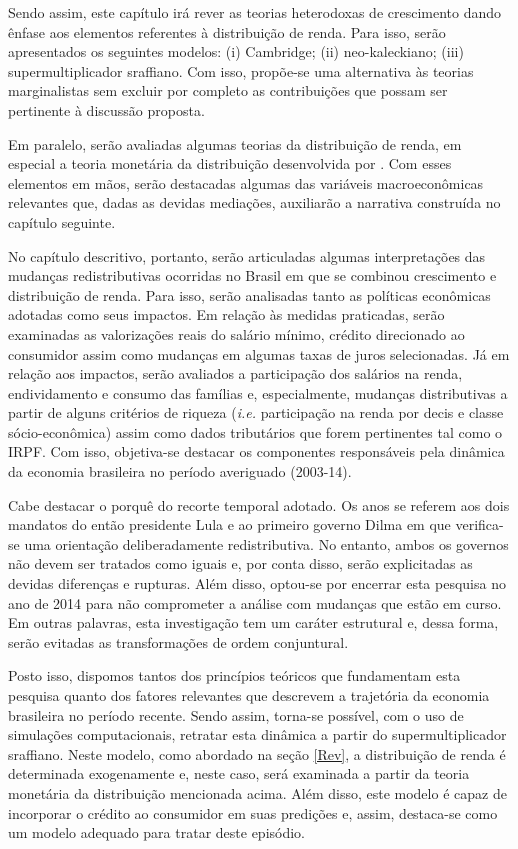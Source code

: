 Sendo assim, este capítulo irá rever as teorias heterodoxas de crescimento dando ênfase aos elementos referentes à distribuição de renda. Para isso, serão apresentados os seguintes modelos: (i) Cambridge; (ii) neo-kaleckiano; (iii) supermultiplicador sraffiano. Com isso, propõe-se uma alternativa às teorias marginalistas sem excluir por completo as contribuições que possam ser pertinente à discussão proposta.

Em paralelo, serão avaliadas algumas teorias da distribuição de renda, em especial a teoria monetária da distribuição desenvolvida por \textcite{pivetti_essay_1992}. Com esses elementos em mãos, serão destacadas algumas das variáveis macroeconômicas relevantes que, dadas as devidas mediações, auxiliarão a narrativa construída no capítulo seguinte.

No capítulo descritivo, portanto, serão articuladas algumas interpretações das mudanças redistributivas ocorridas no Brasil em que se combinou crescimento e distribuição de renda. Para isso, serão analisadas tanto as políticas econômicas adotadas como seus impactos. Em relação às medidas praticadas, serão examinadas as valorizações reais do salário mínimo, crédito direcionado ao consumidor assim como mudanças em algumas taxas de juros selecionadas. Já em relação aos impactos, serão avaliados a participação dos salários na renda, endividamento e consumo das famílias e, especialmente, mudanças distributivas a partir de alguns critérios de riqueza (\textit{i.e.} participação na renda por decis e classe sócio-econômica) assim como dados tributários que forem pertinentes tal como o IRPF. Com isso, objetiva-se destacar os componentes responsáveis pela dinâmica da economia brasileira no período averiguado (2003-14). 

Cabe destacar o porquê do recorte temporal adotado. Os anos se referem aos dois mandatos do então presidente Lula e ao primeiro governo Dilma em que verifica-se uma orientação deliberadamente redistributiva. No entanto, ambos os governos não devem ser tratados como iguais e, por conta disso, serão explicitadas as devidas diferenças e rupturas. Além disso, optou-se por encerrar esta pesquisa no ano de 2014 para não comprometer a análise com mudanças que estão em curso. Em outras palavras, esta investigação tem um caráter estrutural e, dessa forma, serão evitadas as transformações de ordem conjuntural. 

Posto isso, dispomos tantos dos princípios teóricos que fundamentam esta pesquisa quanto dos fatores relevantes que descrevem a trajetória da economia brasileira no período recente. Sendo assim, torna-se possível, com o uso de simulações computacionais, retratar esta dinâmica a partir do supermultiplicador sraffiano. Neste modelo, como abordado na seção \ref{Rev},  a distribuição de renda é determinada exogenamente e, neste caso, será examinada a partir da teoria monetária da distribuição mencionada acima. Além disso, este modelo é capaz de incorporar o crédito ao consumidor em suas predições e, assim, destaca-se como um modelo adequado para tratar deste episódio.

